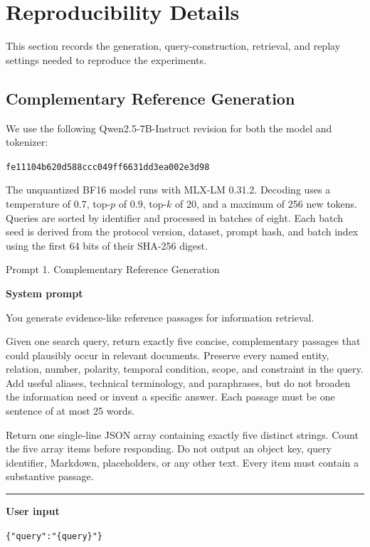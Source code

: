 \section{Reproducibility Details}

\label{sec:appendix-reproducibility}

\raggedbottom
\makeatletter
\setlength{\@fptop}{0pt}
\setlength{\@fpsep}{12pt plus 2pt minus 2pt}
\setlength{\@fpbot}{0pt plus 1fil}
\setlength{\@dblfptop}{0pt}
\setlength{\@dblfpsep}{12pt plus 2pt minus 2pt}
\setlength{\@dblfpbot}{0pt plus 1fil}
\makeatother

This section records the generation, query-construction, retrieval, and replay settings needed to reproduce the experiments.

\subsection{Complementary Reference Generation}

\label{complementary-reference-generation}

We use the following Qwen2.5-7B-Instruct revision for both the model and tokenizer:

{\footnotesize\texttt{fe11104b620d588ccc049ff6631dd3ea002e3d98}}

The unquantized BF16 model runs with MLX-LM 0.31.2. Decoding uses a temperature of 0.7, top-\(p\) of 0.9, top-\(k\) of 20, and a maximum of 256 new tokens. Queries are sorted by identifier and processed in batches of eight. Each batch seed is derived from the protocol version, dataset, prompt hash, and batch index using the first 64 bits of their SHA-256 digest.

\begin{promptbox}{Prompt 1. Complementary Reference Generation}

\textbf{System prompt}

You generate evidence-like reference passages for information retrieval.

Given one search query, return exactly five concise, complementary passages that could plausibly occur in relevant documents. Preserve every named entity, relation, number, polarity, temporal condition, scope, and constraint in the query. Add useful aliases, technical terminology, and paraphrases, but do not broaden the information need or invent a specific answer. Each passage must be one sentence of at most 25 words.

Return one single-line JSON array containing exactly five distinct strings. Count the five array items before responding. Do not output an object key, query identifier, Markdown, placeholders, or any other text. Every item must contain a substantive passage.

\begin{center}\rule{0.5\linewidth}{0.5pt}\end{center}

\textbf{User input}

\texttt{\{"query":"\{query\}"\}}

\end{promptbox}


